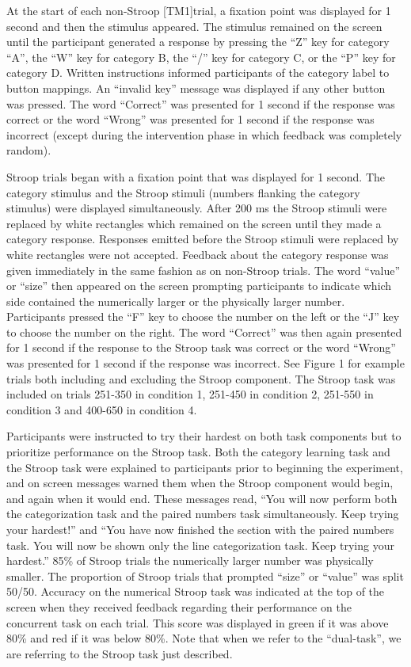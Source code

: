 At the start of each non-Stroop [TM1]trial, a fixation point was displayed for 1
second and then the stimulus appeared. The stimulus remained on the screen until
the participant generated a response by pressing the ``Z'' key for category
``A'', the ``W'' key for category B, the ``/'' key for category C, or the ``P''
key for category D. Written instructions informed participants of the category
label to button mappings. An ``invalid key'' message was displayed if any other
button was pressed. The word ``Correct'' was presented for 1 second if the
response was correct or the word ``Wrong'' was presented for 1 second if the
response was incorrect (except during the intervention phase in which feedback
was completely random).

Stroop trials began with a fixation point that was displayed for 1 second. The
category stimulus and the Stroop stimuli (numbers flanking the category
stimulus) were displayed simultaneously. After 200 ms the Stroop stimuli were
replaced by white rectangles which remained on the screen until they made a
category response. Responses emitted before the Stroop stimuli were replaced by
white rectangles were not accepted. Feedback about the category response was
given immediately in the same fashion as on non-Stroop trials. The word ``value''
or ``size'' then appeared on the screen prompting participants to indicate which
side contained the numerically larger or the physically larger number.
Participants pressed the ``F'' key to choose the number on the left or the ``J''
key to choose the number on the right. The word ``Correct'' was then again
presented for 1 second if the response to the Stroop task was correct or the
word ``Wrong'' was presented for 1 second if the response was incorrect. See
Figure 1 for example trials both including and excluding the Stroop component.
The Stroop task was included on trials 251-350 in condition 1, 251-450 in
condition 2, 251-550 in condition 3 and 400-650 in condition 4.

Participants were instructed to try their hardest on both task components but to
prioritize performance on the Stroop task. Both the category learning task and
the Stroop task were explained to participants prior to beginning the
experiment, and on screen messages warned them when the Stroop component would
begin, and again when it would end. These messages read, ``You will now perform
both the categorization task and the paired numbers task simultaneously. Keep
trying your hardest!'' and ``You have now finished the section with the paired
numbers task. You will now be shown only the line categorization task. Keep
trying your hardest.'' 85\% of Stroop trials the numerically larger number was
physically smaller. The proportion of Stroop trials that prompted ``size'' or
``value'' was split 50/50. Accuracy on the numerical Stroop task was indicated
at the top of the screen when they received feedback regarding their performance
on the concurrent task on each trial. This score was displayed in green if it
was above 80\% and red if it was below 80\%. Note that when we refer to the
``dual-task'', we are referring to the Stroop task just described. 